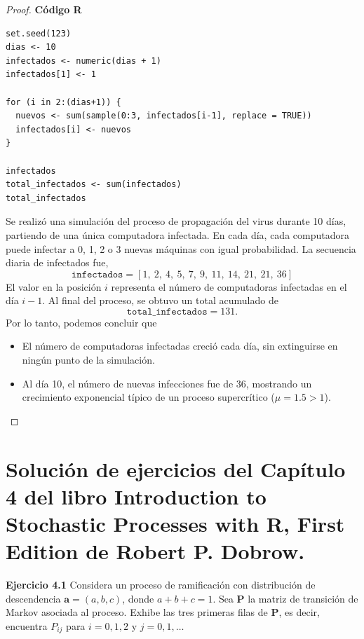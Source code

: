\documentclass{article}
\begin{document}
\begin{proof}
\textbf{Código R}

\begin{lstlisting}
set.seed(123)
dias <- 10
infectados <- numeric(dias + 1)
infectados[1] <- 1

for (i in 2:(dias+1)) {
  nuevos <- sum(sample(0:3, infectados[i-1], replace = TRUE))
  infectados[i] <- nuevos
}

infectados
total_infectados <- sum(infectados)
total_infectados   
\end{lstlisting}

Se realizó una simulación del proceso de propagación del virus durante 10 días, partiendo de una única computadora infectada. En cada día, cada computadora puede infectar a 0, 1, 2 o 3 nuevas máquinas con igual probabilidad. La secuencia diaria de infectados fue,
\[
\texttt{infectados} = [1,\ 2,\ 4,\ 5,\ 7,\ 9,\ 11,\ 14,\ 21,\ 21,\ 36]
\]
El valor en la posición \( i \) representa el número de computadoras infectadas en el día \( i-1 \). Al final del proceso, se obtuvo un total acumulado de
\[
\texttt{total\_infectados} = 131.
\]
Por lo tanto, podemos concluir que
\begin{itemize}
    \item El número de computadoras infectadas creció cada día, sin extinguirse en ningún punto de la simulación.
    \item Al día 10, el número de nuevas infecciones fue de 36, mostrando un crecimiento exponencial típico de un proceso supercrítico (\( \mu = 1.5 > 1 \)).
\end{itemize}
\end{proof}


\section*{Solución de ejercicios del Capítulo 4 del libro Introduction to Stochastic Processes with R, First Edition de Robert P. Dobrow.}

\textbf{Ejercicio 4.1}
 Considera un proceso de ramificación con distribución de descendencia $\mathbf{a} = (a, b, c)$, donde $a + b + c = 1$. Sea $\mathbf{P}$ la matriz de transición de Markov asociada al proceso. Exhibe las tres primeras filas de $\mathbf{P}$, es decir, encuentra $P_{ij}$ para $i = 0, 1, 2$ y $j = 0, 1, \dots$
\end{document}

